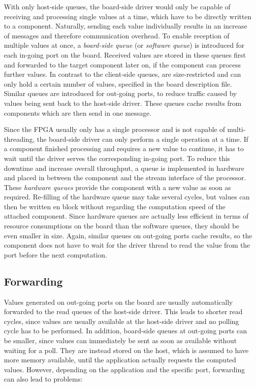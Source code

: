 \documentclass{report}
\begin{document}
With only host-side queues, the board-side driver would only be capable of receiving and processing single values at a time, which have to be directly written to a component. Naturally, sending each value individually results in an increase of messages and therefore communication overhead. To enable reception of multiple values at once, a \textit{board-side queue} (or \textit{software queue}) is introduced for each in-going port on the board. Received values are stored in these queues first and forwarded to the target component later on, if the component can process further values. In contrast to the client-side queues, are size-restricted and can only hold a certain number of values, specified in the board description file.
Similar queues are introduced for out-going ports, to reduce traffic caused by values being sent back to the host-side driver. These queues cache results from components which are then send in one message.

Since the FPGA usually only has a single processor and is not capable of multi-threading, the board-side driver can only perform a single operation at a time. If a component finished processing and requires a new value to continue, it has to wait until the driver serves the corresponding in-going port. To reduce this downtime and increase overall throughput, a queue is implemented in hardware and placed in between the component and the stream interface of the processor. These \textit{hardware queues} provide the component with a new value as soon as required. Re-filling of the hardware queue may take several cycles, but values can then be written en block without regarding the computation speed of the attached component. Since hardware queues are actually less efficient in terms of resource consumptions on the board than the software queues, they should be even smaller in size. Again, similar queues on out-going ports cache results, so the component does not have to wait for the driver thread to read the value from the port before the next computation.

\subsection{Forwarding}
\label{sec:arch:fwd}
Values generated on out-going ports on the board are usually automatically forwarded to the read queues of the host-side driver. This leads to shorter read cycles, since values are usually available at the host-side driver and no polling cycle has to be performed. In addition, board-side queues at out-going ports can be smaller, since values can immediately be sent as soon as available without waiting for a poll. They are instead stored on the host, which is assumed to have more memory available, until the application actually requests the computed values. However, depending on the application and the specific port, forwarding can also lead to problems:
\end{document}
